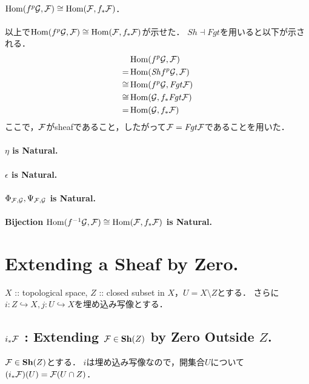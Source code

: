 \documentclass[a4paper]{jsarticle}
\newcommand{\Sh}{\mathbf{Sh}}
\newcommand{\ftorSh}{\mathit{Sh}}
\newcommand{\ftorFgt}{\mathit{Fgt}}
\begin{document}
    \paragraph{$\operatorname{Hom}(f^p\mathcal{G}, \mathcal{F}) \cong \operatorname{Hom}(\mathcal{F}, f_*\mathcal{F})$.}
    以上で$\operatorname{Hom}(f^p\mathcal{G}, \mathcal{F}) \cong \operatorname{Hom}(\mathcal{F}, f_*\mathcal{F})$が示せた．
    $\ftorSh \dashv \ftorFgt$を用いると以下が示される．
    \begin{align*}
        {}&     \Hom(f^p\shG, \shF) \\
        =&      \Hom(\ftorSh f^p \shG, \shF) \\
        \cong&  \Hom(f^p \shG, \ftorFgt \shF) \\
        \cong&  \Hom(\shG, f_* \ftorFgt \shF) \\
        =&      \Hom(\shG, f_* \shF)
    \end{align*}
    ここで，$\mathcal{F}$がsheafであること，したがって$\shF = \ftorFgt \shF$であることを用いた．

    \paragraph{$\eta$ is Natural.}
    \paragraph{$\epsilon$ is Natural.}
    \paragraph{$\Phi_{\mathcal{F}, \mathcal{G}}, \Psi_{\mathcal{F}, \mathcal{G}}$ is Natural.}
    \paragraph{Bijection $\operatorname{Hom}(f^{-1}\mathcal{G}, \mathcal{F}) \cong \operatorname{Hom}(\mathcal{F}, f_*\mathcal{F})$ is Natural.}

\section{Extending a Sheaf by Zero.} %
    $X$ :: topological space, $Z$ :: closed subset in $X$，$U=X \setminus Z$とする．
    さらに$i: Z \hookrightarrow X, j: U \hookrightarrow X$を埋め込み写像とする．

    \subsection{$i_* \mathcal{F}$ : Extending $\shF \in \Sh(Z)$ by Zero Outside $Z$.}
    $\shF \in \Sh(Z)$とする．
    $i$は埋め込み写像なので，開集合$U$について$(i_* \mathcal{F})(U)=\mathcal{F}(U \cap Z)$．
\end{document}
